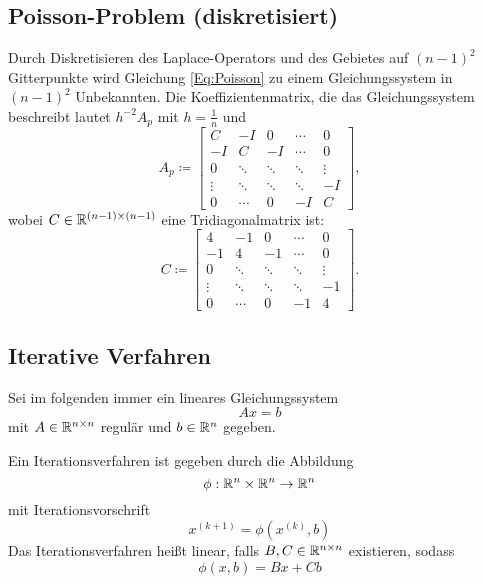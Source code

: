 \documentclass{scrartcl}
\begin{document}
\subsection{Poisson-Problem (diskretisiert)}
Durch Diskretisieren des Laplace-Operators und des Gebietes auf \((n-1)^2\)
Gitterpunkte wird Gleichung \ref{Eq:Poisson} zu einem Gleichungssystem in
\((n-1)^2\) Unbekannten. Die Koeffizientenmatrix, die das Gleichungssystem
beschreibt lautet \(h^{-2}A_p\) mit \(h = \frac{1}{n}\) und
\[
    A_p \coloneq \begin{bmatrix}
        C      & -I     & 0      & \cdots & 0      \\
        -I     & C      & -I     & \cdots & 0      \\
        0      & \ddots & \ddots & \ddots & \vdots \\
        \vdots & \ddots & \ddots & \ddots & -I     \\
        0      & \cdots & 0      & -I     & C
    \end{bmatrix},
\]
wobei \(C \in \mathbb{R}^{(n-1) \times (n-1)}\) eine Tridiagonalmatrix ist:
\[
    C \coloneq \begin{bmatrix}
        4      & -1     & 0      & \cdots & 0      \\
        -1     & 4      & -1     & \cdots & 0      \\
        0      & \ddots & \ddots & \ddots & \vdots \\
        \vdots & \ddots & \ddots & \ddots & -1     \\
        0      & \cdots & 0      & -1     & 4
    \end{bmatrix}.
\]\cite{HandoutLU}

\subsection{Iterative Verfahren}
Sei im folgenden immer ein lineares Gleichungssystem
\[Ax=b\]
mit \(A \in \mathbb{R}^{n \times n}\) regulär und \(b \in \mathbb{R}^n\) gegeben.
\begin{definition}\cite{Iterative}
    Ein Iterationsverfahren ist gegeben durch die Abbildung
    \[\phi:\mathbb{R}^n \times \mathbb{R}^n \rightarrow \mathbb{R}^n\]
    mit Iterationsvorschrift
    \[x^{(k+1)}=\phi(x^{(k)},b)\]
    Das Iterationsverfahren heißt linear, falls \(B,C \in \mathbb{R}^{n \times n}\)
    existieren, sodass
    \[\phi(x,b)=Bx+Cb\]
\end{definition}
\end{document}
